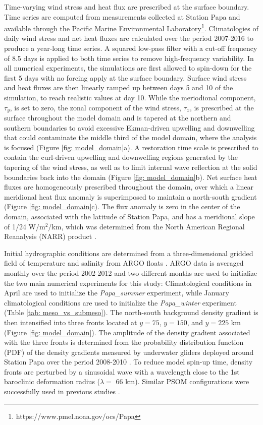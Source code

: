 \documentclass[draft,linenumbers]{agujournal2018}
\begin{document}
Time-varying wind stress and heat flux are prescribed at the surface boundary. Time series are computed from measurements collected at Station Papa and available through the Pacific Marine Environmental Laboratory\footnote{https://www.pmel.noaa.gov/ocs/Papa}. Climatologies of daily wind stress and net heat fluxes are calculated over the period 2007-2016 to produce a year-long time series. A squared low-pass filter with a cut-off frequency of 8.5 days is applied to both time series to remove high-frequency variability. In all numerical experiments, the simulations are first allowed to spin-down for the first 5 days with no forcing apply at the surface boundary. Surface wind stress and heat fluxes are then linearly ramped up between days 5 and 10 of the simulation, to reach realistic values at day 10. %
While the meriodional component, $\tau_y$, is set to zero, the zonal component of the wind stress, $\tau_x$, is prescribed at the surface throughout the model domain and is tapered at the northern and southern boundaries to avoid excessive Ekman-driven upwelling and downwelling that could contaminate the middle third of the model domain, where the analysis is focused (Figure \ref{fig: model_domain}a). A restoration time scale is prescribed to contain the curl-driven upwelling and downwelling regions generated by the tapering of the wind stress, as well as to limit internal wave reflection at the solid boundaries back into the domain (Figure \ref{fig: model_domain}b). Net surface heat fluxes are homogeneously prescribed throughout the domain, over which a linear meridional heat flux anomaly is superimposed to maintain a north-south gradient (Figure \ref{fig: model_domain}c). The flux anomaly is zero in the center of the domain, associated with the latitude of Station Papa, and has a meridional slope of 1/24 W/m$^2$/km, which was determined from the North American Regional Reanalysis (NARR) product \citep{Mesinger_2006}.

Initial hydrographic conditions are determined from a three-dimensional gridded field of temperature and salinity from ARGO floats \citep{Gaillard_2009,Gaillard_2016}. ARGO data is averaged monthly over the period 2002-2012 and two different months are used to initialize the two main numerical experiments for this study: Climatological conditions in April are used to initialize the \textit{Papa\_summer} experiment, while January climatological conditions are used to initialize the \textit{Papa\_winter} experiment (Table \ref{tab: meso_vs_submeso}). The north-south background density gradient is then intensified into three fronts located at $y = 75$, $y = 150$, and $y = 225$ km (Figure \ref{fig: model_domain}). The amplitude of the density gradient associated with the three fronts is determined from the probability distribution function (PDF) of the density gradients measured by underwater gliders deployed around Station Papa over the period 2008-2010 \citep{Pelland_2016}. To reduce model spin-up time, density fronts are perturbed by a sinusoidal wave with a wavelength close to the 1st baroclinic deformation radius ($\lambda = $ 66 km). Similar PSOM configurations were successfully used in previous studies \citep{Mahadevan_2012,Omand_2015}.
\end{document}
